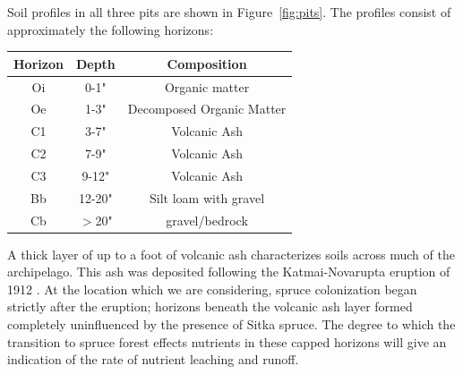 \documentclass[hidelinks, 12pt]{article}
\begin{document}
Soil profiles in all three pits are shown in Figure~\ref{fig:pits}. The profiles consist of approximately the following horizons:

\begin{center}
 \begin{tabular}{||c | c | c||}
 \hline
 Horizon & Depth & Composition \\ [0.5ex]
 \hline\hline
 Oi & 0-1" & Organic matter \\
 \hline
 Oe & 1-3" & Decomposed Organic Matter\\
 \hline
 C1 & 3-7" & Volcanic Ash \\
 \hline
 C2 & 7-9" & Volcanic Ash \\
 \hline
 C3 & 9-12" & Volcanic Ash\\
 \hline
 Bb & 12-20" & Silt loam with gravel \\
 \hline
 Cb & $>$20" & gravel/bedrock \\ [1ex]
 \hline
\end{tabular}
\end{center}

A thick layer of up to a foot of volcanic ash characterizes soils across much of the archipelago. This ash was deposited following the Katmai-Novarupta eruption of 1912 \cite{hildreth2012novarupta}. At the location which we are considering, spruce colonization began strictly after the eruption; horizons beneath the volcanic ash layer formed completely uninfluenced by the presence of Sitka spruce. The degree to which the transition to spruce forest effects nutrients in these capped horizons will give an indication of the rate of nutrient leaching and runoff.






\newpage


\end{document}

